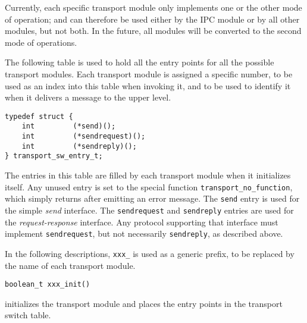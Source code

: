 Currently, each specific transport module only implements one or the
other mode of operation; and can therefore be used either by the IPC
module or by all other modules, but not both. In the future, all
modules will be converted to the second mode of operations.

The following table is used to hold all the entry points for all the
possible transport modules. Each transport module is assigned a
specific number, to be used as an index into this table when invoking
it, and to be used to identify it when it delivers a message to the
upper level.
\begin{verbatim}
typedef struct {
    int	        (*send)();
    int	        (*sendrequest)();
    int         (*sendreply)();
} transport_sw_entry_t;
\end{verbatim}

The entries in this table are filled by each transport module when it
initializes itself. Any unused entry is set to the special function
\verb"transport_no_function", which simply returns after emitting an
error message. The \verb"send" entry is used for the simple {\it send}
interface.  The \verb"sendrequest" and \verb"sendreply" entries are
used for the {\it request-response} interface. Any protocol supporting
that interface must implement \verb"sendrequest", but not necessarily
\verb"sendreply", as described above.

In the following descriptions, \verb"xxx_" is used as a generic
prefix, to be replaced by the name of each transport module.

\begin{verbatim}
boolean_t xxx_init()
\end{verbatim}
initializes the transport module and places the entry points in the
transport switch table.

